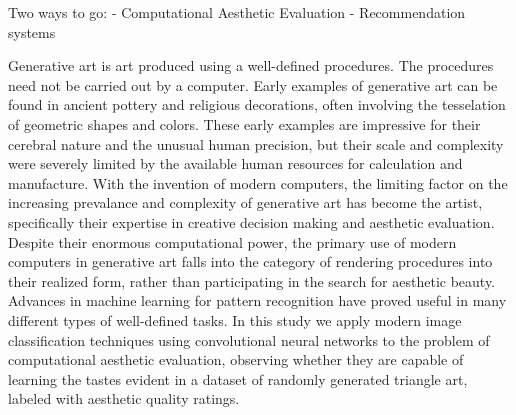 \documentclass[midd]{thesis}
\begin{document}
  Two ways to go:
  - Computational Aesthetic Evaluation
  - Recommendation systems







Generative art is art produced using a well-defined procedures. The procedures need not be carried out by a computer. Early examples of generative art can be found in ancient pottery and religious decorations, often involving the tesselation of geometric shapes and colors. These early examples are impressive for their cerebral nature and the unusual human precision, but their scale and complexity were severely limited by the available human resources for  calculation and manufacture. With the invention of modern computers, the limiting factor on the increasing prevalance and complexity of generative art has become the artist, specifically their expertise in creative decision making and aesthetic evaluation. Despite their enormous computational power, the primary use of modern computers in generative art falls into the category of rendering procedures into their realized form, rather than participating in the search for aesthetic beauty. Advances in machine learning for pattern recognition have proved useful in many different types of well-defined tasks. In this study we apply modern image classification techniques using convolutional neural networks to the problem of computational aesthetic evaluation, observing whether they are capable of learning the tastes evident in a dataset of randomly generated triangle art, labeled with aesthetic quality ratings.

\end{document}
